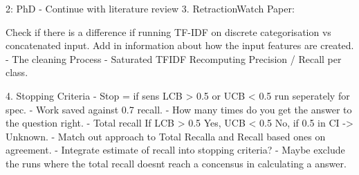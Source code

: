 
2: PhD - Continue with literature review
3. RetractionWatch Paper:

Check if there is a difference if running TF-IDF on discrete categorisation vs concatenated input.
Add in information about how the input features are created.
- The cleaning Process  
- Saturated TFIDF
Recomputing Precision / Recall per class.

4. Stopping Criteria
- Stop = if sens LCB > 0.5 or UCB < 0.5 run seperately for spec. 
- Work saved against 0.7 recall.
- How many times do you get the answer to the question right. 
- Total recall If LCB > 0.5 Yes, UCB < 0.5 No, if 0.5 in CI -> Unknown. 
- Match out approach to Total Recalla and Recall based ones on agreement. 
- Integrate estimate of recall into stopping criteria?
- Maybe exclude the runs where the total recall doesnt reach a concensus in calculating a answer.
